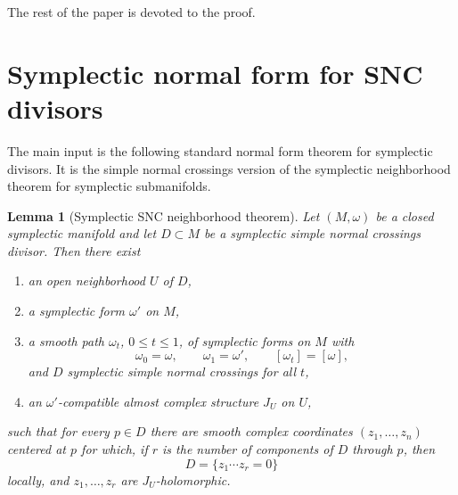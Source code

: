 \documentclass[11pt]{article}
\newtheorem{lemma}[theorem]{Lemma}
\theoremstyle{definition}
\theoremstyle{remark}
\begin{document}
The rest of the paper is devoted to the proof.

\section{Symplectic normal form for SNC divisors}

The main input is the following standard normal form theorem for symplectic divisors. It is the simple normal crossings version of the symplectic neighborhood theorem for symplectic submanifolds.

\begin{lemma}[Symplectic SNC neighborhood theorem]\label{lem:snc-neighborhood}
Let \((M,\omega)\) be a closed symplectic manifold and let \(D\subset M\) be a symplectic simple normal crossings divisor. Then there exist
\begin{enumerate}
\item an open neighborhood \(U\) of \(D\),
\item a symplectic form \(\omega'\) on \(M\),
\item a smooth path \(\omega_t\), \(0\le t\le 1\), of symplectic forms on \(M\) with
\[
\omega_0=\omega,\qquad \omega_1=\omega',\qquad [\omega_t]=[\omega],
\]
and \(D\) symplectic simple normal crossings for all \(t\),
\item an \(\omega'\)-compatible almost complex structure \(J_U\) on \(U\),
\end{enumerate}
such that for every \(p\in D\) there are smooth complex coordinates \((z_1,\dots,z_n)\) centered at \(p\) for which, if \(r\) is the number of components of \(D\) through \(p\), then
\[
D=\{z_1\cdots z_r=0\}
\]
locally, and \(z_1,\dots,z_r\) are \(J_U\)-holomorphic.
\end{lemma}
\end{document}
